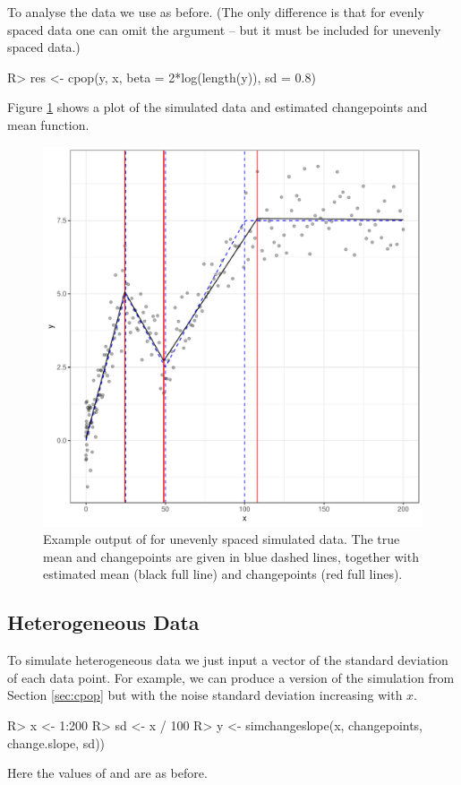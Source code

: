 \documentclass[nojss]{jss}
\begin{document}
To analyse the data we use  as before. (The only difference is that for evenly spaced data one can omit the  argument -- but it must be included for unevenly spaced data.)
\begin{CodeChunk}
\begin{CodeInput}
R> res <- cpop(y, x, beta = 2*log(length(y)), sd = 0.8)
\end{CodeInput}
\end{CodeChunk}
%
%
Figure \ref{fig:cpop-example-uneven} shows a plot of the simulated data and estimated changepoints and mean function.

\begin{figure}
\centering
\includegraphics[width=0.6\linewidth]{figures/cpop_example_uneven_ggplot.pdf}
\caption{Example output of  for unevenly spaced simulated data. The true mean and changepoints are given in blue dashed lines, together with estimated mean (black full line) and changepoints (red full lines). }
\label{fig:cpop-example-uneven}
\end{figure}
%
%
\subsection{Heterogeneous Data}

To simulate heterogeneous data we just input a vector of the standard deviation of each data point. For example, we can produce a version of the simulation from Section \ref{sec:cpop} but with the noise standard deviation increasing with $x$.

\begin{CodeChunk}
\begin{CodeInput}
R> x <- 1:200
R> sd <- x / 100
R> y <- simchangeslope(x, changepoints, change.slope, sd))
\end{CodeInput}
\end{CodeChunk}
%
%
Here the values of  and  are as before.
\end{document}
